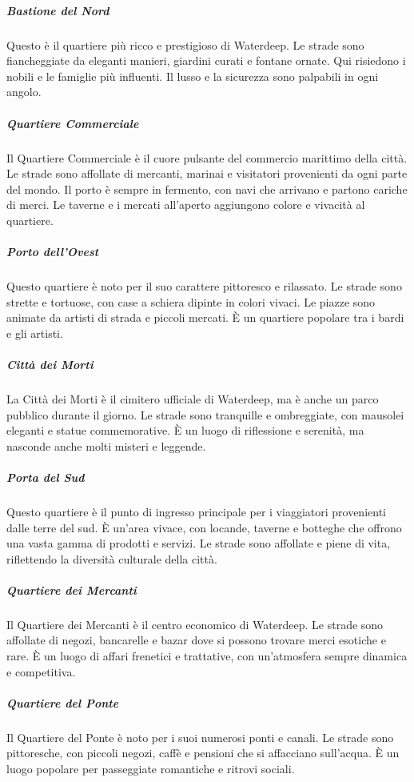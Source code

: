 \documentclass{article}
\begin{document}
\subparagraph{Bastione del Nord}
Questo è il quartiere più ricco e prestigioso di Waterdeep. Le strade sono fiancheggiate da eleganti manieri, giardini curati e fontane ornate. Qui risiedono i nobili e le famiglie più influenti. Il lusso e la sicurezza sono palpabili in ogni angolo.

\subparagraph{Quartiere Commerciale}
Il Quartiere Commerciale è il cuore pulsante del commercio marittimo della città. Le strade sono affollate di mercanti, marinai e visitatori provenienti da ogni parte del mondo. Il porto è sempre in fermento, con navi che arrivano e partono cariche di merci. Le taverne e i mercati all'aperto aggiungono colore e vivacità al quartiere.

\subparagraph{Porto dell'Ovest}
Questo quartiere è noto per il suo carattere pittoresco e rilassato. Le strade sono strette e tortuose, con case a schiera dipinte in colori vivaci. Le piazze sono animate da artisti di strada e piccoli mercati. È un quartiere popolare tra i bardi e gli artisti.

\subparagraph{Città dei Morti}
La Città dei Morti è il cimitero ufficiale di Waterdeep, ma è anche un parco pubblico durante il giorno. Le strade sono tranquille e ombreggiate, con mausolei eleganti e statue commemorative. È un luogo di riflessione e serenità, ma nasconde anche molti misteri e leggende.

\subparagraph{Porta del Sud}
Questo quartiere è il punto di ingresso principale per i viaggiatori provenienti dalle terre del sud. È un'area vivace, con locande, taverne e botteghe che offrono una vasta gamma di prodotti e servizi. Le strade sono affollate e piene di vita, riflettendo la diversità culturale della città.

\subparagraph{Quartiere dei Mercanti}
Il Quartiere dei Mercanti è il centro economico di Waterdeep. Le strade sono affollate di negozi, bancarelle e bazar dove si possono trovare merci esotiche e rare. È un luogo di affari frenetici e trattative, con un'atmosfera sempre dinamica e competitiva.

\subparagraph{Quartiere del Ponte}
Il Quartiere del Ponte è noto per i suoi numerosi ponti e canali. Le strade sono pittoresche, con piccoli negozi, caffè e pensioni che si affacciano sull'acqua. È un luogo popolare per passeggiate romantiche e ritrovi sociali.
\end{document}
